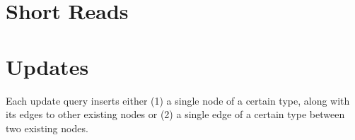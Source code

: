 
\section{Short Reads}
\label{sec:short-reads}










\section{Updates}
\label{sec:updates}

Each update query inserts either (1) a single node of a certain type, along with its edges to other existing nodes or (2) a single edge of a certain type between two existing nodes.










\renewcommand{\currentQueryCard}{0}
